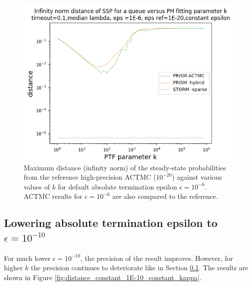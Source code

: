 \documentclass{article}
\numberwithin{equation}{section}		%
\numberwithin{figure}{section}			%
\numberwithin{table}{section}				%
\begin{document}
	\begin{figure}[H]
		\begin{center}
			\includegraphics[trim=0.3cm 0cm 0cm 1.35cm,width=15cm, clip]{picture/New_model/1E-6/distance_constant_1E-6.png}
		\end{center}
		\caption{Maximum distance (infinity norm) of the steady-state probabilities from the reference high-precision ACTMC ($10^{-20}$) against various values of $k$ for default absolute termination epsilon $\epsilon = 10^{-6}$. ACTMC results for $\epsilon = 10^{-6}$ are also compared to the reference.}
		\label{fig:distance_constant_standard_constant_kappa}
	\end{figure}
	
	\pagebreak
	\subsection{Lowering absolute termination epsilon to $\epsilon = 10^{-10}$}
	\label{lowering}
	
	For much lower $\epsilon = 10^{-10}$, the precision of the result improves. However, for higher $k$ the precision continues to deteriorate like in Section \ref{lowering}. The results are shown in Figure \ref{fig:distance_constant_1E-10_constant_kappa}.
	
\end{document}

